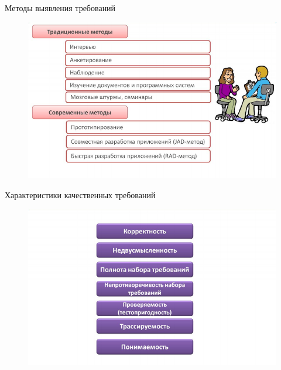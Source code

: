 \documentclass{beamer}
\begin{document}
\begin{frame}[t]{Методы выявления требований}
\begin{figure}[h]
\centering
\includegraphics[scale=0.5]{images/lec02-pic12.png}
\end{figure}
\end{frame}

\begin{frame}[t]{Характеристики качественных требований}
\begin{figure}[h]
\centering
\includegraphics[scale=0.5]{images/lec02-pic13.png}
\end{figure}
\end{frame}
\end{document}

